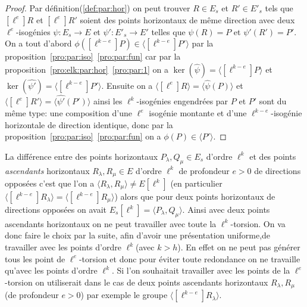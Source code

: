 \documentclass[10pt,a4paper]{book}
\theoremstyle{plain}
\theoremstyle{definition}
\theoremstyle{definition}
\theoremstyle{definition}
\theoremstyle{definition}
\theoremstyle{definition}
\theoremstyle{remark}
\theoremstyle{remark}
\theoremstyle{definition}
\begin{document}
\begin{proof}
Par définition(\ref{def:par:hor}) on peut trouver
$R \in E_s$ et $R' \in E'_s$ tels que $[\ell^e]R$ et $[\ell^e]R'$ 
soient des points horizontaux de même direction avec deux $\ell^e$-isogénies 
$\psi:E_s \rightarrow E$ et $\psi':E'_s \rightarrow E'$ telles que $\psi(R)=P$ 
et $\psi'(R')=P'$. On a tout d'abord $ \phi([\ell^{k-e}]P) \in \langle 
[\ell^{k-e}]P' \rangle$  par la proposition~\ref{pro:par:iso}~\eqref{pro:par:fun} car par la 
proposition~\ref{pro:elk:par:hor}~\eqref{pro:par:1} on a $\ker(\widehat{\psi})= \langle 
[\ell^{k-e}]P \rangle$ et $\ker(\widehat{\psi'})= \langle [\ell^{k-e}]P' 
\rangle$. Ensuite on a $\langle [\ell^e]R \rangle = \langle 
\widehat{\psi}(P) \rangle $ et $\langle [\ell^e]R' \rangle = \langle 
\widehat{\psi'}(P') \rangle$ ainsi les $\ell^{k}$-isogénies engendrées par 
$P$ et $P'$ sont du même type: une composition d'une $\ell^e$ isogénie montante 
et d'une $\ell^{k-e}$-isogénie horizontale de direction identique, donc par la 
proposition~\ref{pro:par:iso}~\eqref{pro:par:fun} on a $\phi(P) \in \langle P' \rangle$.
\end{proof}


La différence entre des points horizontaux $P_{\lambda}, Q_{\mu} \in E_s$ 
d'ordre $\ell^k$ et des points \emph{ascendants} horizontaux $R_{\lambda}, 
R_{\mu} \in E$ d'ordre $\ell^k$ de profondeur $e>0$ de directions opposées 
c'est que l'on a $\langle R_{\lambda}, R_{\mu} \rangle \neq E[\ell^k]$ (en 
particulier$\langle [\ell^{k-e}]R_{\lambda} \rangle = \langle 
[\ell^{k-e}]R_{\mu} \rangle$) alors que pour deux points horizontaux de 
directions opposées on avait $E_s[\ell^k]= \langle P_{\lambda}, Q_{\mu} \rangle$. 
Ainsi avec deux points ascendants horizontaux on ne peut travailler avec 
toute la $\ell^k$-torsion. On va donc faire le choix par la suite, afin d'avoir
une présentation uniforme,de travailler avec les points d'ordre $\ell^k$(avec 
$k>h$). En effet on ne peut pas générer tous les point de $\ell^e$-torsion et 
donc pour éviter toute redondance on ne travaille qu'avec les points d'ordre 
$\ell^k$. Si l'on souhaitait travailler avec les points de la $\ell^e$-torsion 
on utiliserait dans le cas de deux points ascendants horizontaux 
$R_{\lambda}, R_{\mu}$ (de profondeur $e>0$) par exemple le groupe $\langle 
[\ell^{k-e}]R_{\lambda} \rangle$.
\end{document}
